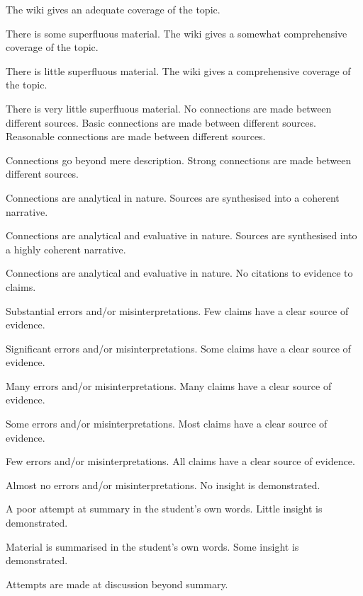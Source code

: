 \documentclass{../../fal_assignment}
\begin{document}
\begin{markingrubric}
		\grade 		The wiki gives an adequate coverage of the topic.
		\par			There is some superfluous material.
		\grade 		The wiki gives a somewhat comprehensive coverage of the topic.
		\par			There is little superfluous material.
		\grade 		The wiki gives a comprehensive coverage of the topic.
		\par			There is very little superfluous material.
		\grade\fail No connections are made between different sources.
		\grade		Basic connections are made between different sources.
		\grade		Reasonable connections are made between different sources.
		\par		Connections go beyond mere description.
		\grade		Strong connections are made between different sources.
		\par		Connections are analytical in nature.
		\grade		Sources are synthesised into a coherent narrative.
		\par		Connections are analytical and evaluative in nature.
		\grade		Sources are synthesised into a highly coherent narrative.
		\par		Connections are analytical and evaluative in nature.
		\grade\fail 	No citations to evidence to claims.
		\par 		Substantial errors and/or misinterpretations.
		\grade 		Few claims have a clear source of evidence.
		\par 		Significant errors and/or misinterpretations.
		\grade 		Some claims have a clear source of evidence.
		\par 		Many errors and/or misinterpretations.
		\grade 		Many claims have a clear source of evidence.
		\par 		Some errors and/or misinterpretations.
		\grade 		Most claims have a clear source of evidence.
		\par 		Few errors and/or misinterpretations.
		\grade 		All claims have a clear source of evidence.
		\par 		Almost no errors and/or misinterpretations.
		\grade\fail No insight is demonstrated.
		\par		A poor attempt at summary in the student's own words.
		\grade		Little insight is demonstrated.
		\par		Material is summarised in the student's own words.
		\grade		Some insight is demonstrated.
		\par		Attempts are made at discussion beyond summary.

\end{markingrubric}
\end{document}
